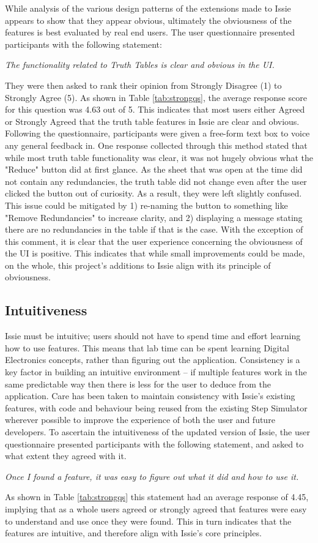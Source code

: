 While analysis of the various design patterns of the extensions made to Issie appears to show that they appear obvious, ultimately the obviousness of the features is best evaluated by real end users. The user questionnaire presented participants with the following statement:
\begin{center}
    \textit{The functionality related to Truth Tables is clear and obvious in the UI.}
\end{center}
They were then asked to rank their opinion from Strongly Disagree (1) to Strongly Agree (5). As shown in Table \ref{tab:strongqs}, the average response score for this question was 4.63 out of 5. This indicates that most users either Agreed or Strongly Agreed that the truth table features in Issie are clear and obvious. Following the questionnaire, participants were given a free-form text box to voice any general feedback in. One response collected through this method stated that while most truth table functionality was clear, it was not hugely obvious what the "Reduce" button did at first glance. As the sheet that was open at the time did not contain any redundancies, the truth table did not change even after the user clicked the button out of curiosity. As a result, they were left slightly confused. This issue could be mitigated by 1) re-naming the button to something like "Remove Redundancies" to increase clarity, and 2) displaying a message stating there are no redundancies in the table if that is the case. 
With the exception of this comment, it is clear that the user experience concerning the obviousness of the UI is positive. This indicates that while small improvements could be made, on the whole, this project's additions to Issie align with its principle of obviousness.

\subsection{Intuitiveness}
Issie must be intuitive; users should not have to spend time and effort learning how to use features. This means that lab time can be spent learning Digital Electronics concepts, rather than figuring out the application. Consistency is a key factor in building an intuitive environment -- if multiple features work in the same predictable way then there is less for the user to deduce from the application. Care has been taken to maintain consistency with Issie's existing features, with code and behaviour being reused from the existing Step Simulator wherever possible to improve the experience of both the user and future developers. To ascertain the intuitiveness of the updated version of Issie, the user questionnaire presented participants with the following statement, and asked to what extent they agreed with it.
\begin{center}
    \textit{Once I found a feature, it was easy to figure out what it did and how to use it.}
\end{center}
As shown in Table \ref{tab:strongqs} this statement had an average response of 4.45, implying that as a whole users agreed or strongly agreed that features were easy to understand and use once they were found. This in turn indicates that the features are intuitive, and therefore align with Issie's core principles.

